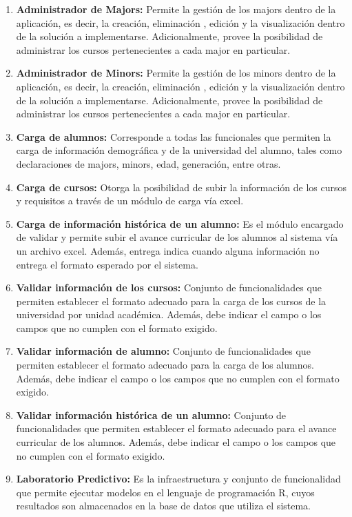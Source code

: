 \begin{enumerate}
	\item \textbf{Administrador de Majors:} Permite la gestión de los majors dentro de la aplicación, es decir, la creación, eliminación , edición y la visualización dentro de la solución a implementarse. Adicionalmente, provee la posibilidad de administrar los cursos pertenecientes a cada major en particular.
	\item \textbf{Administrador de Minors:} Permite la gestión de los minors dentro de la aplicación, es decir, la creación, eliminación , edición y la visualización dentro de la solución a implementarse. Adicionalmente, provee la posibilidad de administrar los cursos pertenecientes a cada major en particular.
	\item \textbf{Carga de alumnos:} Corresponde a todas las funcionales que permiten la carga de información demográfica y de la universidad del alumno, tales como declaraciones de majors, minors, edad, generación, entre otras.
	\item \textbf{Carga de cursos:} Otorga la posibilidad de subir la información de los cursos y requisitos a través de un módulo de carga vía excel.
	\item \textbf{Carga de información histórica de un alumno:} Es el módulo encargado de validar y permite subir el avance curricular de los alumnos al sistema vía un archivo excel. Además, entrega indica cuando alguna información no entrega el formato esperado por el sistema.
	\item \textbf{Validar información de los cursos:} Conjunto de funcionalidades que permiten establecer el formato adecuado para la carga de los cursos de la universidad por unidad académica. Además, debe indicar el campo o los campos que no cumplen con el formato exigido.
	\item \textbf{Validar información de alumno:} Conjunto de funcionalidades que permiten establecer el formato adecuado para la carga de los alumnos. Además, debe indicar el campo o los campos que no cumplen con el formato exigido.
	\item \textbf{Validar información histórica de un alumno:} Conjunto de funcionalidades que permiten establecer el formato adecuado para el avance curricular de los alumnos. Además, debe indicar el campo o los campos que no cumplen con el formato exigido.
	\item \textbf{Laboratorio Predictivo:} Es la infraestructura y conjunto de funcionalidad que permite ejecutar modelos en el lenguaje de programación R, cuyos resultados son almacenados en la base de datos que utiliza el sistema.

\end{enumerate}
